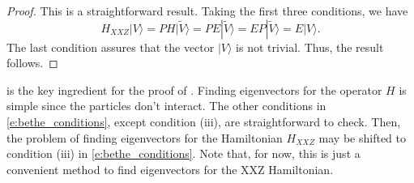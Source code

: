 \documentclass[a4paper,11pt]{article}
\theoremstyle{definition}
\begin{document}
\begin{proof}
This is a straightforward result. Taking the first three conditions, we have
\begin{equation}
    H_{XXZ} | V \rangle = P H | \tilde{V} \rangle = P E | \tilde{V} \rangle = E P | \tilde{V} \rangle = E | V \rangle.
\end{equation}
The last condition assures that the vector $|V \rangle$ is not trivial. Thus, the result follows.
\end{proof}

 is the key ingredient for the proof of . Finding eigenvectors for the operator $H$ is simple since the particles don't interact. The other conditions in \eqref{e:bethe_conditions}, except condition (iii), are straightforward to check. Then, the problem of finding eigenvectors for the Hamiltonian $H_{XXZ}$ may be shifted to condition (iii) in \eqref{e:bethe_conditions}. Note that, for now, this is just a convenient method to find eigenvectors for the XXZ Hamiltonian. 
\end{document}
